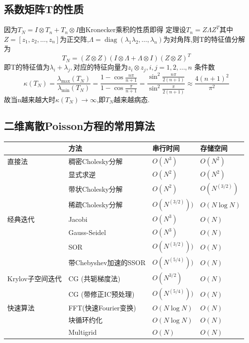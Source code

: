 \documentclass[12pt,a4paper]{article}
\begin{document}
\subsection*{ 系数矩阵T的性质}
因为$T_{N}=I \otimes T_{n}+T_{n} \otimes I$由Kronecker乘积的性质即得
{\color{blue}定理}\quad 设$T_{n}=Z \Lambda Z^{T}$其中$Z=\left[z_{1}, z_{2}, \ldots, z_{n}\right]$为正交阵,$\Lambda=\operatorname{diag}\left(\lambda_{1}\lambda_{2}, \dots, \lambda_{n} \right)$为对角阵,则T的特征值分解为
$$
T_{N}=(Z \otimes Z)(I \otimes \Lambda+\Lambda \otimes I)(Z \otimes Z)^{T}
$$
即T的特征值为$\lambda_{i}+\lambda_{j},$对应的特征向量为$ z_{i} \otimes z_{j}, i, j=1,2, \dots, n$
条件数
$$
\kappa\left(T_{N}\right)=\frac{\lambda_{\max }\left(T_{N}\right)}{\lambda_{\min }\left(T_{N}\right)}=\frac{1-\cos \frac{n \pi}{n+1}}{1-\cos \frac{\pi}{n+1}}=\frac{\sin ^{2} \frac{n \pi}{2(n+1)}}{\sin ^{2} \frac{\pi}{2(n+1)}} \approx \frac{4(n+1)^{2}}{\pi^{2}}
$$
故当n越来越大时$\kappa\left(T_{N}\right) \rightarrow \infty$,即$T_N$越来越病态.
\newpage
\subsection*{ 二维离散Poisson方程的常用算法}
\begin{tabular}{l|lll}
\hline
{}&方法&串行时间&存储空间\\
\hline
\hline
直接法&稠密Cholesky分解&$O(N^3)$&$O(N^2)$\\
{}&显式求逆&$O(N^2)$&$O(N^2)$\\
{}&带状Cholesky分解&$O(N^2)$&$O(N^(3/2))$\\
{}&稀疏Cholesky分解&$O(N^(3/2)))$&$O(N\log N)$\\
\hline
经典迭代&Jacobi&$O(N^3)$&$O(N)$\\
{}&Gauss-Seidel&$O(N^3)$&$O(N)$\\
{}&SOR&$O(N^(3/2)))$&$O(N)$\\
{}& 带Chebyshev加速的SSOR &$O(N^(5/4)))$&$O(N)$\\
\hline
Krylov子空间迭代&CG (共轭梯度法)&$O(N^{3/2})$&$O(N)$\\
{}&CG (带修正IC预处理)&$O(N^(5/4)))$&$O(N)$\\
\hline
快速算法&FFT(快速Fourier变换)&$O(N\log N)$&$O(N)$\\
{}&块循环约化&$O(N\log N)$&$O(N)$\\
{}&Multigrid&$O(N)$&$O(N)$\\
\hline
\end{tabular}
\end{document}

